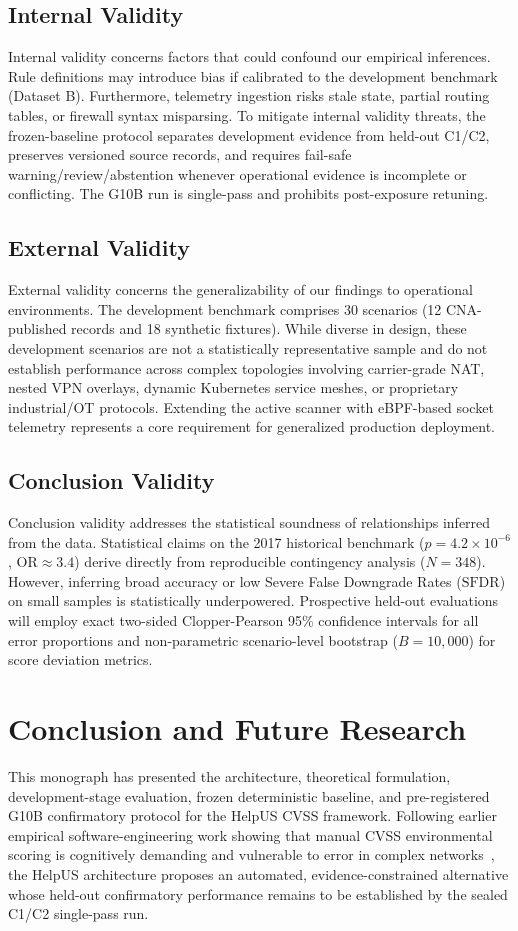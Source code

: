 \subsection{Internal Validity}
Internal validity concerns factors that could confound our empirical inferences. Rule definitions may introduce bias if calibrated to the development benchmark (Dataset B). Furthermore, telemetry ingestion risks stale state, partial routing tables, or firewall syntax misparsing. To mitigate internal validity threats, the frozen-baseline protocol separates development evidence from held-out C1/C2, preserves versioned source records, and requires fail-safe warning/review/abstention whenever operational evidence is incomplete or conflicting. The G10B run is single-pass and prohibits post-exposure retuning.

\subsection{External Validity}
External validity concerns the generalizability of our findings to operational environments. The development benchmark comprises 30 scenarios (12 CNA-published records and 18 synthetic fixtures). While diverse in design, these development scenarios are not a statistically representative sample and do not establish performance across complex topologies involving carrier-grade NAT, nested VPN overlays, dynamic Kubernetes service meshes, or proprietary industrial/OT protocols. Extending the active scanner with eBPF-based socket telemetry represents a core requirement for generalized production deployment.

\subsection{Conclusion Validity}
Conclusion validity addresses the statistical soundness of relationships inferred from the data. Statistical claims on the 2017 historical benchmark ($p = 4.2 \times 10^{-6}$, $\text{OR} \approx 3.4$) derive directly from reproducible contingency analysis ($N=348$). However, inferring broad accuracy or low Severe False Downgrade Rates ($\text{SFDR}$) on small samples is statistically underpowered. Prospective held-out evaluations will employ exact two-sided Clopper-Pearson 95\% confidence intervals for all error proportions and non-parametric scenario-level bootstrap ($B=10,000$) for score deviation metrics.

\section{Conclusion and Future Research}
This monograph has presented the architecture, theoretical formulation, development-stage evaluation, frozen deterministic baseline, and pre-registered G10B confirmatory protocol for the HelpUS CVSS framework. Following earlier empirical software-engineering work showing that manual CVSS environmental scoring is cognitively demanding and vulnerable to error in complex networks~\cite{santos2017estimating}, the HelpUS architecture proposes an automated, evidence-constrained alternative whose held-out confirmatory performance remains to be established by the sealed C1/C2 single-pass run.


